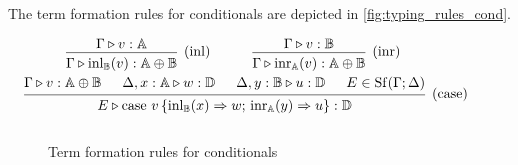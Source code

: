 \documentclass[a4paper,UKenglish,cleveref, autoref, thm-restate]{lipics-v2021}
\begin{document}
The term formation rules for conditionals are depicted in \autoref{fig:typing_rules_cond}. 
\begin{figure}[H]
    \begin{equation*}
    \begin{aligned}
    &\hspace{10pt}
    \begin{prooftree}
        \hypo{\Gamma \vljud v: \typeA}
        \infer1[(inl)]{\Gamma \vljud \inl_{\typeB}(v): \typeA \oplus \typeB}
    \end{prooftree}
    \hspace{30pt}
    \begin{prooftree}
        \hypo{\Gamma \vljud v: \typeB}
        \infer1[(inr)]{\Gamma \vljud \inr_{\typeA}(v): \typeA \oplus \typeB}
    \end{prooftree} 
    \\
    &\hspace{-20pt}
    \begin{prooftree}
        \hypo{\Gamma \vljud v: \typeA \oplus \typeB}
        \hypo{\Delta, x: \typeA \vljud w: \typeD}
        \hypo{\Delta, y: \typeB \vljud u: \typeD}
        \hypo{E \in \Shuff(\Gamma; \Delta)}
        \infer4[(case)]{E \vljud \text{case } v\,
        \{\inl_{\typeB}(x) 
            \Rightarrow w ; \,
          \inr_{\typeA}(y) \Rightarrow u
        \}: \typeD}
    \end{prooftree}
    \\[10pt]
    \end{aligned}
    \end{equation*}
    \caption{Term formation rules for conditionals}
    \label{fig:typing_rules_cond}
\end{figure}
\end{document}
